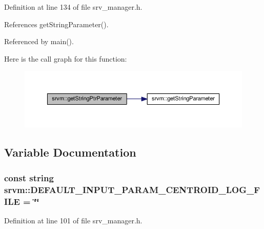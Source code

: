 Definition at line 134 of file srv\-\_\-manager.\-h.



References get\-String\-Parameter().



Referenced by main().



Here is the call graph for this function\-:
\nopagebreak
\begin{figure}[H]
\begin{center}
\leavevmode
\includegraphics[width=350pt]{namespacesrvm_a2fe9c141c7827eaa0269319f179dfee5_cgraph}
\end{center}
\end{figure}




\subsection{Variable Documentation}
\hypertarget{namespacesrvm_a92921b8b79655fa69a697a54dca42056}{
\subsubsection[{D\-E\-F\-A\-U\-L\-T\-\_\-\-I\-N\-P\-U\-T\-\_\-\-P\-A\-R\-A\-M\-\_\-\-C\-E\-N\-T\-R\-O\-I\-D\-\_\-\-L\-O\-G\-\_\-\-F\-I\-L\-E}]{\setlength{\rightskip}{0pt plus 5cm}const string srvm\-::\-D\-E\-F\-A\-U\-L\-T\-\_\-\-I\-N\-P\-U\-T\-\_\-\-P\-A\-R\-A\-M\-\_\-\-C\-E\-N\-T\-R\-O\-I\-D\-\_\-\-L\-O\-G\-\_\-\-F\-I\-L\-E = \char`\"{}\char`\"{}}}\label{namespacesrvm_a92921b8b79655fa69a697a54dca42056}


Definition at line 101 of file srv\-\_\-manager.\-h.



